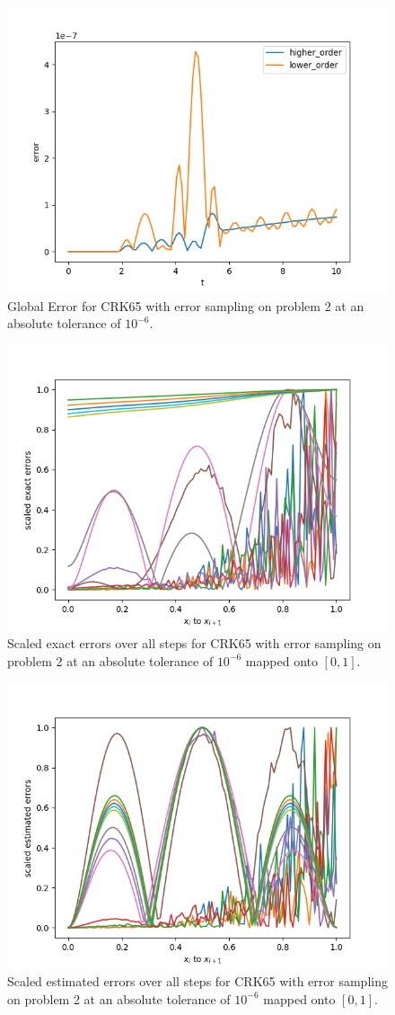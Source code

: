 \begin{figure}[H]
\centering
\includegraphics[width=0.7\linewidth]{./figures/crk65_sampling_p2_global_error}
\caption{Global Error for CRK65 with error sampling on problem 2 at an absolute tolerance of $10^{-6}$.}
\label{fig:crk65_sampling_p2_global_error}
\end{figure}

\begin{figure}[H]
\centering
\includegraphics[width=0.7\linewidth]{./figures/crk65_sampling_p2_scaled_errors}
\caption{Scaled exact errors over all steps for CRK65 with error sampling on problem 2 at an absolute tolerance of $10^{-6}$ mapped onto $[0, 1]$.}
\label{fig:crk65_sampling_p2_scaled_errors}
\end{figure}

\begin{figure}[H]
\centering
\includegraphics[width=0.7\linewidth]{./figures/crk65_sampling_p2_scaled_estimated_errors}
\caption{Scaled estimated errors over all steps for CRK65 with error sampling on problem 2 at an absolute tolerance of $10^{-6}$ mapped onto $[0, 1]$.}
\label{fig:crk65_sampling_p2_scaled_estimated_errors}
\end{figure}

